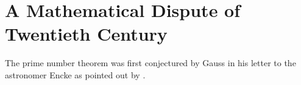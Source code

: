\documentclass[elemannt.tex]{subfile}
\begin{document}
	\chapter{A Mathematical Dispute of Twentieth Century}\label{ch:dispute}
	The prime number theorem was first conjectured by Gauss in his letter to the astronomer Encke as pointed out by \textcite[pp. 37]{landau_1911}.
\end{document}
